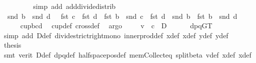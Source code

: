 \begin{isabellebody}
\ \ \ \ \isamarkupfalse%
\ {}\ {}\ \isamarkupfalse%
\ {\isacharparenleft}{\kern0pt}simp\ add{\isacharcolon}{\kern0pt}\ add{\isacharunderscore}{\kern0pt}divide{\isacharunderscore}{\kern0pt}distrib{\isacharparenright}{\kern0pt}\isanewline
\ \ \isamarkupfalse%
\ {}{\isacharcolon}{\kern0pt}\ {\isachardoublequoteopen}{\isacharparenleft}{\kern0pt}snd\ b\ {\isacharminus}{\kern0pt}\ snd\ d{\isacharparenright}{\kern0pt}\ {\isacharasterisk}{\kern0pt}\ \ fst\ c\ {\isacharplus}{\kern0pt}\ {\isacharparenleft}{\kern0pt}fst\ d\ {\isacharminus}{\kern0pt}\ fst\ b{\isacharparenright}{\kern0pt}\ {\isacharasterisk}{\kern0pt}\ snd\ c\ {\isacharless}{\kern0pt}\ fst\ d\ {\isacharasterisk}{\kern0pt}\ snd\ b\ {\isacharminus}{\kern0pt}\ fst\ b\ {\isacharasterisk}{\kern0pt}\ snd\ d{\isachardoublequoteclose}\isanewline
\ \ \ \ \isamarkupfalse%
\ cup{\isacharunderscore}{\kern0pt}bcd\ \isamarkupfalse%
\ cup{}{\isacharunderscore}{\kern0pt}def\ cross{}{\isacharunderscore}{\kern0pt}def\ \isamarkupfalse%
\ argo\isanewline
\ \ \isamarkupfalse%
\ {}{\isacharcolon}{\kern0pt}\ {\isachardoublequoteopen}v\ {\isasymbullet}\ c\ {\isacharless}{\kern0pt}\ D{\isachardoublequoteclose}\ \isamarkupfalse%
\ {}\ {}\ {}\ {}\ dpqGT{}\ \isanewline
\ \ \ \ \isamarkupfalse%
\ {\isacharparenleft}{\kern0pt}simp\ add{\isacharcolon}{\kern0pt}\ D{\isacharunderscore}{\kern0pt}def\ divide{\isacharunderscore}{\kern0pt}strict{\isacharunderscore}{\kern0pt}right{\isacharunderscore}{\kern0pt}mono\ inner{\isacharunderscore}{\kern0pt}prod{\isacharunderscore}{\kern0pt}def\ x{}{\isacharunderscore}{\kern0pt}def\ x{}{\isacharunderscore}{\kern0pt}def\ y{}{\isacharunderscore}{\kern0pt}def\ y{}{\isacharunderscore}{\kern0pt}def{\isacharparenright}{\kern0pt}\isanewline
\ \ \isamarkupfalse%
\ {\isacharquery}{\kern0pt}thesis\ \isamarkupfalse%
\ {}\ \isanewline
\ \ \ \ \isamarkupfalse%
\ {\isacharparenleft}{\kern0pt}smt\ {\isacharparenleft}{\kern0pt}verit{\isacharparenright}{\kern0pt}\ D{\isacharunderscore}{\kern0pt}def\ dpq{\isacharunderscore}{\kern0pt}def\ halfspace{\isacharunderscore}{\kern0pt}pos{\isacharunderscore}{\kern0pt}def\ mem{\isacharunderscore}{\kern0pt}Collect{\isacharunderscore}{\kern0pt}eq\ split{\isacharunderscore}{\kern0pt}beta\ v{\isacharunderscore}{\kern0pt}def\ x{}{\isacharunderscore}{\kern0pt}def\ x{}{\isacharunderscore}{\kern0pt}def\isanewline

\end{isabellebody}
